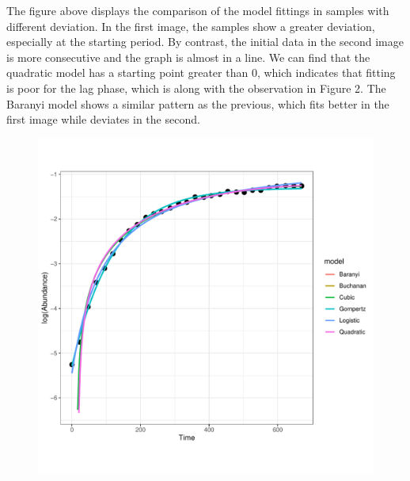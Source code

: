 \documentclass[11pt, oneside]{article}
\begin{document}
		\noindent The figure above displays the comparison of the model fittings in samples with different deviation. In the first image, the samples show a greater deviation, especially at the starting period. By contrast, the initial data in the second image is more consecutive and the graph is almost in a line. We can find that the quadratic model has a starting point greater than 0, which indicates that fitting is poor for the lag phase, which is along with the observation in Figure 2. The Baranyi model shows a similar pattern as the previous, which fits better in the first image while deviates in the second. 
		
		\begin{figure}[H]
			\begin{center}
			\begin{minipage}{.5\textwidth}
				\centering
				\includegraphics[page=114, scale = 0.5]{plot_subsets.pdf}
			\end{minipage}%
			\begin{minipage}{.5\textwidth}
				\centering

\end{minipage}
\end{center}
\end{figure}
\end{document}
